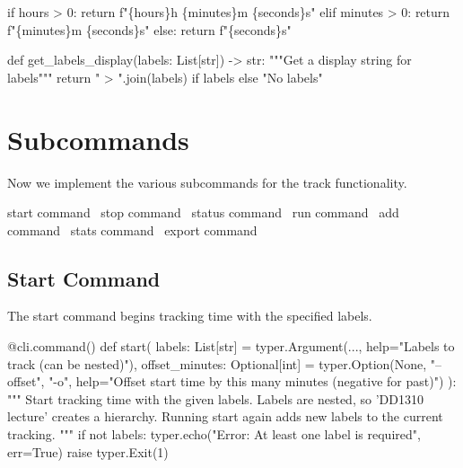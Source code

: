     if hours > 0:
        return f"\{hours\}h \{minutes\}m \{seconds\}s"
    elif minutes > 0:
        return f"\{minutes\}m \{seconds\}s"
    else:
        return f"\{seconds\}s"

def get_labels_display(labels: List[str]) -> str:
    """Get a display string for labels"""
    return " > ".join(labels) if labels else "No labels"
\nwendcode{}\nwdocspar

\section{Subcommands}

Now we implement the various subcommands for the track functionality.

\nwenddocs{}\endmoddef\nwstartdeflinemarkup{}\nwenddeflinemarkup
\LA{}start command~{\nwtagstyle{}}\RA{}
\LA{}stop command~{\nwtagstyle{}}\RA{}
\LA{}status command~{\nwtagstyle{}}\RA{}
\LA{}run command~{\nwtagstyle{}}\RA{}
\LA{}add command~{\nwtagstyle{}}\RA{}
\LA{}stats command~{\nwtagstyle{}}\RA{}
\LA{}export command~{\nwtagstyle{}}\RA{}
\nwendcode{}\nwdocspar

\subsection{Start Command}

The start command begins tracking time with the specified labels.

\nwenddocs{}\endmoddef\nwstartdeflinemarkup{}\nwenddeflinemarkup
@cli.command()
def start(
    labels: List[str] = typer.Argument(..., help="Labels to track (can be nested)"),
    offset_minutes: Optional[int] = typer.Option(None, "--offset", "-o", 
                                               help="Offset start time by this many minutes (negative for past)")
):
    """
    Start tracking time with the given labels.
    Labels are nested, so 'DD1310 lecture' creates a hierarchy.
    Running start again adds new labels to the current tracking.
    """
    if not labels:
        typer.echo("Error: At least one label is required", err=True)
        raise typer.Exit(1)
    
